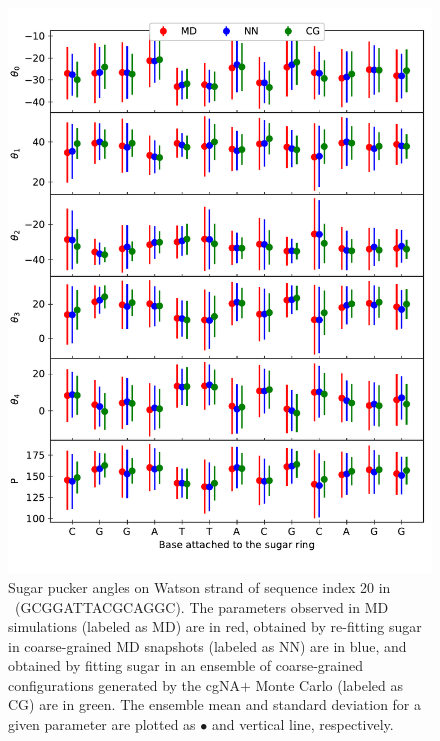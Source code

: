 \clearpage
\begin{figure}[H]
	\begin{center}
	\includegraphics[width=15cm]{images/puck_stats_20_1.pdf}
	\caption{Sugar pucker angles on Watson strand of sequence index 20 in \Lbdna \ (GCGGATTACGCAGGC). 
    The parameters observed in MD simulations (labeled as MD) are in red, obtained by re-fitting sugar in coarse-grained MD snapshots (labeled as NN) are in blue, and obtained by fitting sugar in an ensemble of coarse-grained configurations generated by the cgNA$+$ Monte Carlo (labeled as CG) are in green.
    The ensemble mean and standard deviation for a given parameter are plotted as $\bullet$ and vertical line, respectively.}
\label{c7:fig3}
\end{center}
\end{figure}

